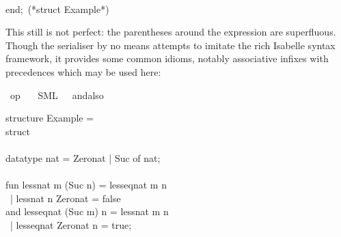 \begin{isabellebody}
\begin{isamarkuptext}
\hspace*{0pt}\\
\hspace*{0pt}end;~(*struct Example*)%
\end{isamarkuptext}%
\isamarkuptrue%
%
\endisatagquote
{\isafoldquote}%
%
\isadelimquote
%
\endisadelimquote
%
\begin{isamarkuptext}%
\noindent This still is not perfect: the parentheses
  around the  expression are superfluous.
  Though the serialiser
  by no means attempts to imitate the rich Isabelle syntax
  framework, it provides some common idioms, notably
  associative infixes with precedences which may be used here:%
\end{isamarkuptext}%
\isamarkuptrue%
%
\isadelimquotett
%
\endisadelimquotett
%
\isatagquotett
{}\isamarkupfalse%
\ {\isachardoublequoteopen}op\ {\isasymand}{\isachardoublequoteclose}\isanewline
\ \ {\isacharparenleft}SML\ \ {}\ {\isachardoublequoteopen}andalso{\isachardoublequoteclose}{\isacharparenright}%
\endisatagquotett
{\isafoldquotett}%
%
\isadelimquotett
%
\endisadelimquotett
%
\isadelimquote
%
\endisadelimquote
%
\isatagquote
%
\begin{isamarkuptext}%
\isatypewriter%
\noindent%
\hspace*{0pt}structure Example = \\
\hspace*{0pt}struct\\
\hspace*{0pt}\\
\hspace*{0pt}datatype nat = Zero{}nat | Suc of nat;\\
\hspace*{0pt}\\
\hspace*{0pt}fun less{}nat m (Suc n) = less{}eq{}nat m n\\
\hspace*{0pt} ~| less{}nat n Zero{}nat = false\\
\hspace*{0pt}and less{}eq{}nat (Suc m) n = less{}nat m n\\
\hspace*{0pt} ~| less{}eq{}nat Zero{}nat n = true;\\
\hspace*{0pt}\\

\end{isamarkuptext}
\end{isabellebody}
